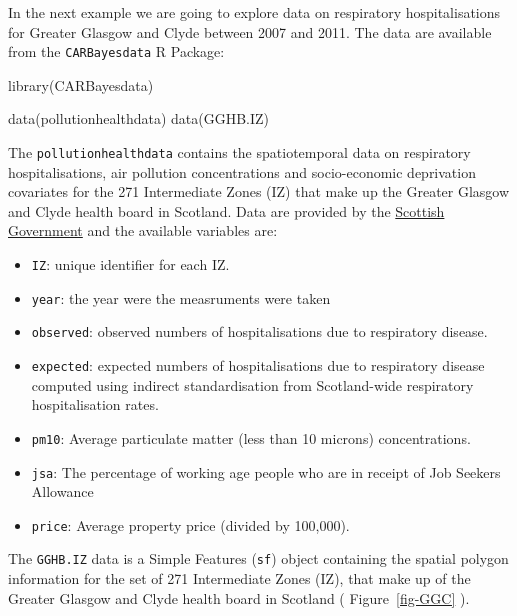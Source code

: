 \documentclass[
  letterpaper,
  DIV=11,
  numbers=noendperiod]{scrartcl}
\newenvironment{Shaded}{\begin{snugshade}}{\end{snugshade}}
\newcommand{\FunctionTok}[1]{\textcolor[rgb]{0.28,0.35,0.67}{#1}}
\newcommand{\NormalTok}[1]{\textcolor[rgb]{0.00,0.23,0.31}{#1}}
\providecommand{\tightlist}{%
  \setlength{\itemsep}{0pt}\setlength{\parskip}{0pt}}\usepackage{longtable,booktabs,array}
\begin{document}
In the next example we are going to explore data on respiratory
hospitalisations for Greater Glasgow and Clyde between 2007 and 2011.
The data are available from the \texttt{CARBayesdata} R Package:

\begin{Shaded}
\begin{Highlighting}[]
\FunctionTok{library}\NormalTok{(CARBayesdata)}

\FunctionTok{data}\NormalTok{(pollutionhealthdata)}
\FunctionTok{data}\NormalTok{(GGHB.IZ)}
\end{Highlighting}
\end{Shaded}

The \texttt{pollutionhealthdata} contains the spatiotemporal data on
respiratory hospitalisations, air pollution concentrations and
socio-economic deprivation covariates for the 271 Intermediate Zones
(IZ) that make up the Greater Glasgow and Clyde health board in
Scotland. Data are provided by the
\href{http://statistics.gov.scot.}{Scottish Government} and the
available variables are:

\begin{itemize}
\tightlist
\item
  \texttt{IZ}: unique identifier for each IZ.
\item
  \texttt{year}: the year were the measruments were taken
\item
  \texttt{observed}: observed numbers of hospitalisations due to
  respiratory disease.
\item
  \texttt{expected}: expected numbers of hospitalisations due to
  respiratory disease computed using indirect standardisation from
  Scotland-wide respiratory hospitalisation rates.
\item
  \texttt{pm10}: Average particulate matter (less than 10 microns)
  concentrations.
\item
  \texttt{jsa}: The percentage of working age people who are in receipt
  of Job Seekers Allowance
\item
  \texttt{price}: Average property price (divided by 100,000).
\end{itemize}

The \texttt{GGHB.IZ} data is a Simple Features (\texttt{sf}) object
containing the spatial polygon information for the set of 271
Intermediate Zones (IZ), that make up of the Greater Glasgow and Clyde
health board in Scotland ( Figure~\ref{fig-GGC} ).
\end{document}
